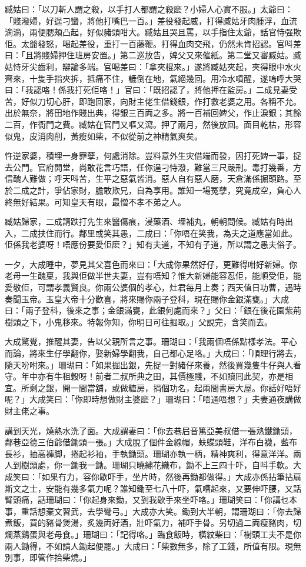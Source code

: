 \documentclass[a5paper, 12pt, openany]{book} %
\begin{document}
	臧姑曰：「以刀斬人謂之殺，以手打人都謂之殺麽？小婦人心實不服。」太爺曰：「賤潑婦，好逞刁蠻，將他打嘴巴一百。」差役發起威，打得臧姑牙肉腫浮，血流滴滴，兩便腮頰凸起，好似豬頭咁大。臧姑且哭且罵，以手指住太爺，話官恃强欺佢。太爺發怒，喝起差役，重打一百藤鞭。打得血肉交飛，仍然未肯招認。官呌差曰：「且將賤婦押住班房安置。」第二巡放告，婢父又來催紙。第二堂又審臧姑。臧姑恃牙尖齒利，辯論多端。官喝差曰：「拿夾棍來。」遂將臧姑夾起，夾得眼中水火齊來，十隻手指夾拆，抵痛不住，轆倒在地，氣絕幾回。用冷水噴醒，遂嗚呼大哭曰：「我認咯！係我打死佢咯！」官曰：「既招認了，將他押在監房。」二成見妻受苦，好似刀切心肝，即跑回家，向財主佬生借錢銀，作打救老婆之用。各稱不允。出於無奈，將田地作賤出典，得銀三百両之多。將一百補回婢父，作止淚銀；其餘二百，作衙門之費。臧姑在官門又嘔又瀉。押了兩月，然後放回。面目乾枯，形容似鬼，皮消肉削，黃瘦如柴，不似從前之神精氣爽矣。

	忤逆家婆，積埋一身罪孽，何處消除。豈料意外生灾借端而發，因打死婢一事，捉去公門。官府開堂，尚敢花言巧語，任你逞刁恃潑，難當三尺嚴刑。毒打幾番，方信醜人難做；呼天呌苦，生平之惡氣皆消。惡人自有惡人磨，天倉滿係掘頭路。至於二成之計，爭佔家財，膽敢欺兄，自為享用。誰知一場冤孽，究竟成空，負心人終無好結果。可知皇天有眼，最憎不孝不弟之人。

	臧姑歸家，二成請跌打先生來醫傷痕，浸藥酒、埋補丸，朝朝問候。臧姑有時出入，二成扶住而行。鄰里或笑其愚，二成曰：「你唔在笑我，為夫之道應當如此。佢係我老婆呀！唔應份要愛佢麽？」知有夫道，不知有子道，所以謂之愚夫俗子。

	一夕，大成睡中，夢見其父喜色而來曰：「大成你果然好仔，更難得咁好新婦。你老母一生醜稟，我與佢做半世夫妻，豈有唔知？惟大新婦能容忍佢，能順受佢，能愛敬佢，可謂孝義賢良。你兩公婆個的孝心，灶君每月上奏；西天值日功曹，遇時奏聞玉帝。玉皇大帝十分歡喜，將來賜你兩子登科，現在賜你金銀滿甕。」大成曰：「兩子登科，後來之事；金銀滿甕，此銀何處而來？」父曰：「銀在後花園紫荊樹頭之下，小鬼移來。特報你知，你明日可往掘取。」父說完，含笑而去。

	大成驚覺，推醒其妻，告以父親所言之事。珊瑚曰：「我兩個唔係點樣孝法。平心而論，將來生仔學翻你，娶新婦學翻我，自己都心足咯。」大成曰：「順理行將去，隨天吩咐來。」珊瑚曰：「如果掘出銀，先捉一對豬仔來養，然後買幾隻牛仔與人看守。年中亦有牛租穀呀！前者二叔所典之田，其價極賤，不如贖囘此契，亦是相宜。所剩之銀，開一間當舖，或做糖房，捐個功名，起兩間書房大屋。你話好唔好呢？」大成笑曰：「你即時想做財主婆麽？」珊瑚曰：「唔通唔想？」夫妻通夜講做財主佬之事。

	講到天光，燒熱水洗了面。大成謂妻曰：「你去巷𡰪音篤亞美叔借一張熟鐵鋤頭，鄰巷亞德三伯爺借鋤頭一張。」大成脫了個件金線帽，蚨蝶頭鞋，洋布白襪，藍布長衫，抽高褲脚，捲起衫袖，手執鋤頭。珊瑚亦執一柄，精神爽利，得意洋洋。兩人到樹頭處，你一鋤我一鋤。珊瑚只曉繡花織布，鋤不上三四十吓，自呌手軟。大成笑曰：「如果冇力，容你歇吓手，坐片時，然後再鋤都做得。」大成亦係拈筆拈扇斯文之士，安能有幾多氣力呢？誰知鋤至七八十吓，氣嘈起來，又要伸吓腰，又話臂頭痛，話珊瑚曰：「你起身來鋤，又到我歇手來坐吓咯。」珊瑚笑曰：「你講乜本事，重話想棄文習武，去學彎弓。」大成亦大笑。鋤到大半朝，謂珊瑚曰：「你去歸煮飯，買的豬骨煲湯，炙幾両好酒，壯吓氣力，補吓手骨。另切過二両瘦豬肉，切爛蒸鷄蛋與老母食。」珊瑚曰：「記得咯。」臨食飯時，橫紋柴曰：「樹頭工夫不是你兩人鋤得，不如請人鋤起便罷。」大成曰：「柴數無多，除了工錢，所值有限。現無別事，即管作拾柴燒。」
\end{document}
